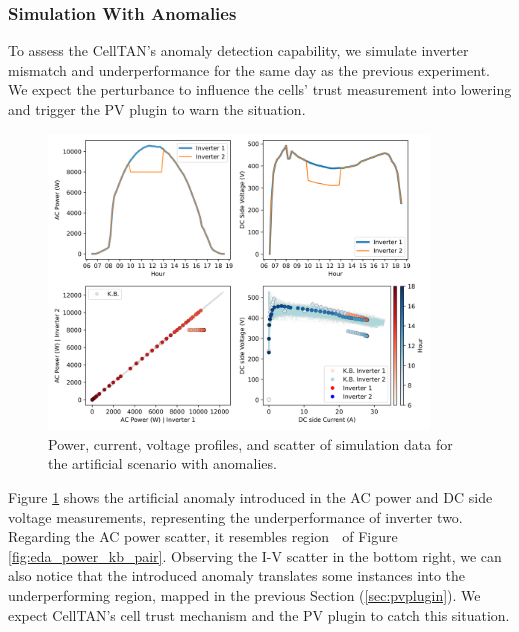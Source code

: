 \subsubsection{Simulation With Anomalies}

To assess the CellTAN's anomaly detection capability, we simulate inverter mismatch and underperformance for the same day as the previous experiment. We expect the perturbance to influence the cells' trust measurement into lowering and trigger the PV plugin to warn the situation.

\begin{figure}[h!]
    \centering
    \includegraphics[width=0.9\textwidth]{figures/chapter5/results/artificial/41_test_clone_02-1.png}
    \caption{Power, current, voltage profiles, and scatter of simulation data for the artificial scenario with anomalies.}
    \label{fig:artificial_02_piv}
\end{figure}

Figure \ref{fig:artificial_02_piv} shows the artificial anomaly introduced in the AC power and DC side voltage measurements, representing the underperformance of inverter two. Regarding the AC power scatter, it resembles region \textcircled{} of Figure \ref{fig:eda_power_kb_pair}. Observing the I-V scatter in the bottom right, we can also notice that the introduced anomaly translates some instances into the underperforming region, mapped in the previous Section (\ref{sec:pvplugin}).
We expect CellTAN's cell trust mechanism and the PV plugin to catch this situation.

